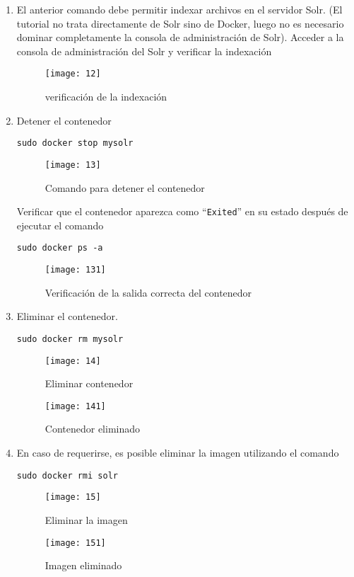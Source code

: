 \documentclass[10pt]{article}   			%
\begin{document}
\begin{enumerate}
\item El anterior comando debe permitir indexar archivos en el servidor Solr. (El tutorial no trata directamente de Solr sino de Docker, luego no es necesario dominar completamente la consola de administración de Solr). Acceder a la consola de administración del Solr y verificar la indexación


\begin{figure}[H]
	\centering
	\texttt{[image: 12]}   
	\caption{verificación de  la indexación} 
\end{figure}

\item Detener el contenedor

\begin{center}
	\texttt{sudo docker stop mysolr}
\end{center}

\begin{figure}[ht]
	\centering
	\texttt{[image: 13]}   
	\caption{Comando para detener el contenedor} 
\end{figure}

Verificar que el contenedor aparezca como “\texttt{Exited}” en su estado después de ejecutar el comando  
\begin{center}
	\texttt{sudo docker ps -a}
\end{center}

\begin{figure}[ht]
	\centering
	\texttt{[image: 131]}   
	\caption{Verificación de la salida correcta del contenedor} 
\end{figure}


\item Eliminar el contenedor.  
\begin{center}
	\texttt{sudo docker rm mysolr}
\end{center}

\begin{figure}[H]
	\centering
	\texttt{[image: 14]}   
	\caption{Eliminar contenedor} 
\end{figure}

\begin{figure}[ht]
	\centering
	\texttt{[image: 141]}   
	\caption{Contenedor eliminado} 
\end{figure}

\item En caso de requerirse, es posible eliminar la imagen utilizando el comando

\begin{center}
	\texttt{sudo docker rmi solr}
\end{center}

\begin{figure}[H]
	\centering
	\texttt{[image: 15]}   
	\caption{Eliminar la imagen} 
\end{figure}

\begin{figure}[ht]
	\centering
	\texttt{[image: 151]}   
	\caption{Imagen eliminado} 
\end{figure}

\end{enumerate}
\end{document}
